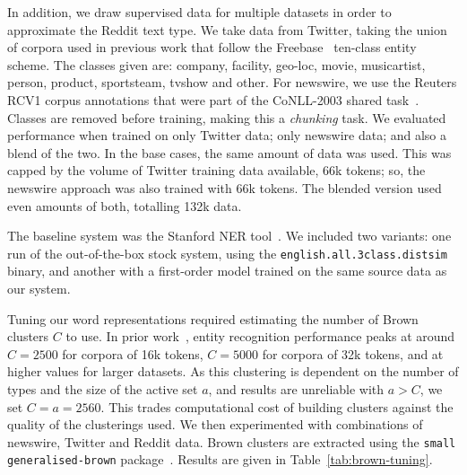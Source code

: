 \documentclass[sigconf,anonymous,review]{acmart}
\begin{document}
In addition, we draw supervised data for multiple datasets in order to approximate the Reddit text type.
We take data from Twitter, taking the union of corpora used in previous work that follow the Freebase~\cite{bollacker2008freebase} ten-class entity scheme.
The classes given are: company, facility, geo-loc, movie, musicartist, person, product, sportsteam, tvshow and other.
For newswire, we use the Reuters RCV1 corpus annotations that were part of the CoNLL-2003 shared task~\cite{tjong2003introduction}.
Classes are removed before training, making this a \emph{chunking} task.
We evaluated performance when trained on only Twitter data; only newswire data; and also a blend of the two.
In the base cases, the same amount of data was used.
This was capped by the volume of Twitter training data available, 66k tokens; so, the newswire approach was also trained with 66k tokens.
The blended version used even amounts of both, totalling 132k data.

The baseline system was the Stanford NER tool~\cite{finkel2005incorporating}.
We included two variants: one run of the out-of-the-box stock system, using the {\tt \small english.all.3class.distsim} binary, and another with a first-order model trained on the same source data as our system.

Tuning our word representations required estimating the number of Brown clusters $C$ to use.
In prior work~\cite{derczynski2015tune}, entity recognition performance %
peaks at around $C=2500$ for corpora of 16k tokens, $C=5000$ for corpora of 32k tokens, and at higher values for larger datasets.
As this clustering is dependent on the number of types and the size of the active set $a$, and results are unreliable with $a>C$, we set $C = a = 2560$.
This trades computational cost of building clusters against the quality of the clusterings used.
We then experimented with combinations of newswire, Twitter and Reddit data.
Brown clusters are extracted using the {\tt small generalised-brown} package~\cite{sean_chester_2015_33758}.
Results are given in Table~\ref{tab:brown-tuning}.
\end{document}
